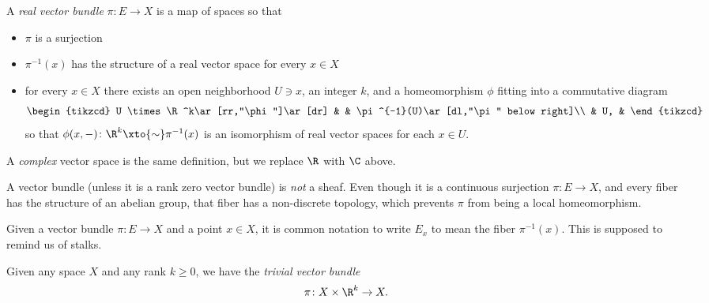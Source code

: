 \documentclass[11pt]{amsart}
\begin{document}
\begin{definition} A \emph{real vector bundle} $\pi \colon E \to X$ is a map of spaces so that
\begin{itemize}
    \item $\pi$ is a surjection
    \item $\pi^{-1}(x)$ has the structure of a real vector space for every $x\in X$
    \item for every $x\in X$ there exists an open neighborhood $U \ni x$, an integer $k$, and a homeomorphism $\phi$ fitting into a commutative diagram
\[ \begin{tikzcd}
    U \times \R^k\ar[rr,"\phi"]\ar[dr] &  & \pi^{-1}(U)\ar[dl,"\pi" below right]\\
     & U, &
\end{tikzcd} \]
so that $\phi(x,-) \colon \R^k \xto{\sim} \pi^{-1}(x)$ is an isomorphism of real vector spaces for each $x\in U$.
\end{itemize}
\end{definition}

A \textit{complex} vector space is the same definition, but we replace $\R$ with $\C$ above.

\begin{remark}
A vector bundle (unless it is a rank zero vector bundle) is \emph{not} a sheaf. Even though it is a continuous surjection $\pi \colon E \to X$, and every fiber has the structure of an abelian group, that fiber has a non-discrete topology, which prevents $\pi$ from being a local homeomorphism.
\end{remark}

\begin{notation} Given a vector bundle $\pi \colon E \to X$ and a point $x\in X$, it is common notation to write $E_x$ to mean the fiber $\pi^{-1}(x)$. This is supposed to remind us of stalks.
\end{notation}

\begin{example} Given any space $X$ and any rank $k\ge0$, we have the \emph{trivial vector bundle}
\begin{align*}
    \pi \colon X \times \R^k \to X.
\end{align*}
\end{example}
\end{document}
